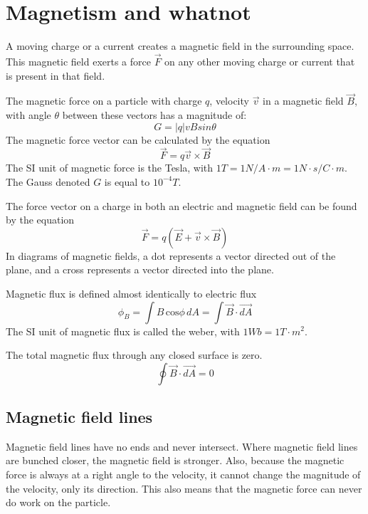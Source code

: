 \documentclass[nobib,notoc]{tufte-handout}
\begin{document}
\section{Magnetism and whatnot}
\begin{rema}
	A moving charge or a current creates a magnetic field in the surrounding space. This magnetic field exerts a force \(\vec{F}\) on any other moving charge or current that is present in that field.
\end{rema}
\begin{defi}
	The magnetic force on a particle with charge \(q\), velocity \(\vec{v}\) in a magnetic field \(\vec{B}\), with angle \(\theta\) between these vectors has a magnitude of:
	\begin{equation*}
		G=\lvert q\rvert vBsin\theta
	\end{equation*}
	The magnetic force vector can be calculated by the equation
	\begin{equation*}
		\vec{F}=q\vec{v}\times\vec{B}
	\end{equation*}
	The SI unit of magnetic force is the Tesla, with \(1T=1N/A\cdot m=1N\cdot s/C\cdot m\). The Gauss denoted \(G\) is equal to \(10^{-4}T\).
\end{defi}
\begin{rema}
	The force vector on a charge in both an electric and magnetic field can be found by the equation
	\begin{equation*}
		\vec{F}=q(\vec{E}+\vec{v}\times\vec{B})
	\end{equation*}
	In diagrams of magnetic fields, a dot represents a vector directed out of the plane, and a cross represents a vector directed into the plane.
\end{rema}
\begin{defi}
Magnetic flux is defined almost identically to electric flux
	\begin{equation*}
		\phi_B=\int B\,\text{cos}\phi\,dA=\int\vec{B}\cdot\vec{dA}
	\end{equation*}
	The SI unit of magnetic flux is called the weber, with \(1Wb=1T\cdot m^2\).
\end{defi}
\begin{defi}
	The total magnetic flux through any closed surface is zero.
	\begin{equation*}
		\oint\vec{B}\cdot\vec{dA}=0
	\end{equation*}
\end{defi}
\subsection{Magnetic field lines}
	Magnetic field lines have no ends and never intersect. Where magnetic field lines are bunched closer, the magnetic field is stronger. Also, because the magnetic force is always at a right angle to the velocity, it cannot change the magnitude of the velocity, only its direction. This also means that the magnetic force can never do work on the particle.
\end{document}
